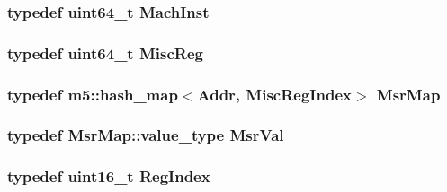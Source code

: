 \label{namespaceX86ISA_a13e8c318dd29afdaf79751a072344db8}
\hypertarget{namespaceX86ISA_a7ceadb544bf9b4a10579b7466b0ac008}{
\subsubsection[{MachInst}]{\setlength{\rightskip}{0pt plus 5cm}typedef uint64\_\-t {\bf MachInst}}}
\label{namespaceX86ISA_a7ceadb544bf9b4a10579b7466b0ac008}
\hypertarget{namespaceX86ISA_aa16539aa6584fd12f7d6fa868f75b4de}{
\subsubsection[{MiscReg}]{\setlength{\rightskip}{0pt plus 5cm}typedef uint64\_\-t {\bf MiscReg}}}
\label{namespaceX86ISA_aa16539aa6584fd12f7d6fa868f75b4de}
\hypertarget{namespaceX86ISA_afe7406830ac3c2d1d425e6b2f8985b0e}{
\subsubsection[{MsrMap}]{\setlength{\rightskip}{0pt plus 5cm}typedef m5::hash\_\-map$<${\bf Addr}, {\bf MiscRegIndex}$>$ {\bf MsrMap}}}
\label{namespaceX86ISA_afe7406830ac3c2d1d425e6b2f8985b0e}
\hypertarget{namespaceX86ISA_a6f30fa1d82bdac857c02f93c6cd605d5}{
\subsubsection[{MsrVal}]{\setlength{\rightskip}{0pt plus 5cm}typedef MsrMap::value\_\-type {\bf MsrVal}}}
\label{namespaceX86ISA_a6f30fa1d82bdac857c02f93c6cd605d5}
\hypertarget{namespaceX86ISA_a69329e1d929a534ff51be6cf8216b69a}{
\subsubsection[{RegIndex}]{\setlength{\rightskip}{0pt plus 5cm}typedef uint16\_\-t {\bf RegIndex}}}
\label{namespaceX86ISA_a69329e1d929a534ff51be6cf8216b69a}


